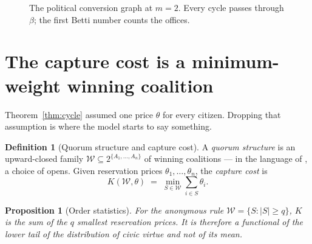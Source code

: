 \documentclass[11pt]{article}
\theoremstyle{plain}
\newtheorem{proposition}[theorem]{Proposition}
\theoremstyle{definition}
\newtheorem{definition}[theorem]{Definition}
\theoremstyle{remark}
\newcommand{\bt}{\beta_1}
\newcommand{\Vt}{\mathsf{V}}
\newcommand{\Ct}{\mathsf{C}}
\newcommand{\Ot}{\mathsf{O}}
\newcommand{\Win}{\mathcal{W}}
\begin{document}
\begin{figure}[t]
\centering
{}
\caption{The political conversion graph at $m=2$. Every cycle passes through
$\beta$; the first Betti number counts the offices.}
\label{fig:graph}
\end{figure}

\section{The capture cost is a minimum-weight winning coalition}
\label{sec:mincut}

Theorem~\ref{thm:cycle} assumed one price $\theta$ for every citizen. Dropping
that assumption is where the model starts to say something.

\begin{definition}[Quorum structure and capture cost]
A \emph{quorum structure} is an upward-closed family
$\Win \subseteq 2^{\{A_1,\dots,A_n\}}$ of winning coalitions --- in the language
of \cite{quorum}, a choice of opens. Given reservation prices
$\theta_1,\dots,\theta_n$, the \emph{capture cost} is
\[
  K(\Win,\theta) \;=\; \min_{S \in \Win} \sum_{i \in S} \theta_i .
\]
\end{definition}

\begin{proposition}[Order statistics]
\label{prop:order}
For the anonymous rule $\Win = \{S : |S| \ge q\}$, $K$ is the sum of the $q$
smallest reservation prices. It is therefore a functional of the \emph{lower
tail} of the distribution of civic virtue and not of its mean.
\end{proposition}
\end{document}
